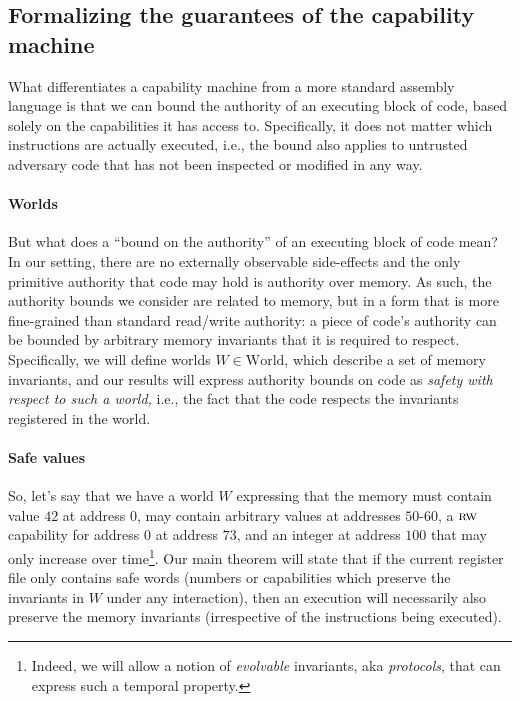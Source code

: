 \documentclass[format=acmsmall, review=false, screen=true]{acmart}
\newcommand{\plaindom}[1]{\mathrm{#1}}
\newcommand{\Worlds}{\plaindom{World}}
\newcommand{\plainperm}[1]{\textsc{#1}}
\newcommand{\readwrite}{\plainperm{rw}}
\newenvironment{toplas}
    {\color{OliveGreen}
          
    }{}
\begin{document}
\begin{toplas}
\subsection{Formalizing the guarantees of the capability machine}
\label{sec:formalizing-guarantees}
What differentiates a capability machine from a more standard assembly language
is that we can bound the authority of an executing block of code, based solely
on the capabilities it has access to. Specifically, it does not matter which
instructions are actually executed, i.e., the bound also applies to untrusted
adversary code that has not been inspected or modified in any way.

\paragraph{Worlds}
But what does a ``bound on the authority'' of an executing block of code mean?
In our setting, there are no externally observable side-effects and the only
primitive authority that code may hold is authority over memory. As such, the
authority bounds we consider are related to memory, but in a form that is more
fine-grained than standard read/write authority: a piece of code's authority can be bounded
by arbitrary memory invariants that it is required to respect. Specifically, we
will define worlds $W \in \Worlds$, which describe a set of memory invariants, and
our results will express authority bounds on code as \emph{safety with respect to such
a world,} i.e., the fact that the code respects the invariants registered in
the world.

\paragraph{Safe values}
So, let's say that we have a world $W$ expressing that the memory must contain
value $42$ at address $0$, may contain arbitrary values at
addresses $50$-$60$, a $\readwrite$ capability for address $0$ at address $73$, and
an integer at address $100$ that may only increase over time\footnote{Indeed, we
  will allow a notion of \emph{evolvable} invariants, aka \emph{protocols}, that can
  express such a temporal property.}. Our main theorem will state that if the
current register file only contains safe words (numbers or capabilities which
preserve the invariants in $W$ under any interaction), then an execution will
necessarily also preserve the memory invariants (irrespective of the instructions being
executed).


\end{toplas}
\end{document}

